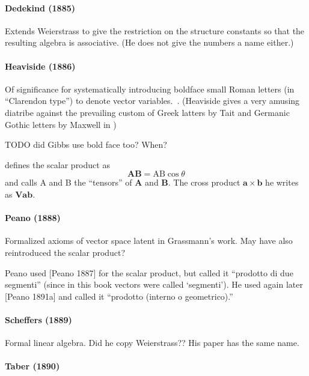 \paragraph{Dedekind (1885)~\cite{Dedekind1885}}

Extends Weierstrass to give the restriction on the structure constants so that the resulting algebra is associative. (He does not give the numbers a name either.)



\paragraph{Heaviside (1886)~\cite{Heaviside1886}}

Of significance for systematically introducing boldface small Roman letters (in ``Clarendon type'') to denote vector variables.~\cite{Heaviside1886}. (Heaviside gives a very amusing diatribe against the prevailing custom of Greek latters by Tait and Germanic Gothic letters by Maxwell in \cite[\S 103, pp. 139-142]{Heaviside1894})

TODO did Gibbs use bold face too? When?

\cite[\S 107]{Heaviside1894} defines the scalar product as
\[
\mathbf{AB} = \mathrm{AB} \cos \theta
\]
and calls A and B the ``tensors'' of $\mathbf{A}$ and $\mathbf{B}$. The cross product $\mathbf a \times \mathbf b$ he writes as $\mathbf{V a b}$.

\paragraph{Peano (1888)~\cite{Peano1888}}

Formalized axioms of vector space latent in Grassmann's work.
May have also reintroduced the scalar product?

Peano used [Peano 1887]
for the scalar product, but called it “prodotto di due segmenti” (since in this book vectors
were called ‘segmenti’). He used
again later [Peano 1891a] and called it “prodotto
(interno o geometrico).”



\paragraph{Scheffers (1889)~\cite{Scheffers1889}}

Formal linear algebra. Did he copy Weierstrass?? His paper has the same name.


\paragraph{Taber (1890)~\cite{Taber1890}}

